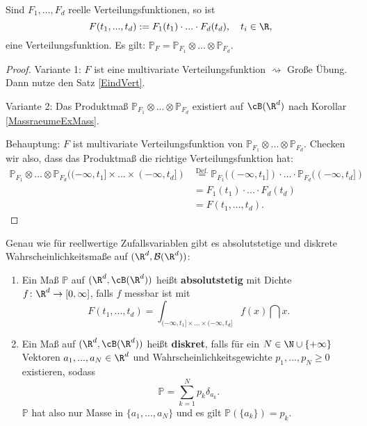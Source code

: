 \begin{prop}\label{id}
	Sind $F_1,...,F_d$ reelle Verteilungsfunktionen, so ist $$ F(t_1,...,t_d) := F_1(t_1)\cdot ... \cdot F_d(t_d),\quad t_i \in \R,$$ eine Verteilungsfunktion. Es gilt: $\mathbb{P}_F = \mathbb{P}_{F_1} \otimes ... \otimes \mathbb{P}_{F_d}$.
\end{prop}

\begin{proof}
Variante 1: $F$ ist eine multivariate Verteilungsfunktion $\rightsquigarrow$ Große Übung. Dann nutze den Satz \ref{EindVert}.\smallskip

Variante 2: Das Produktmaß $\mathbb{P}_{F_1} \otimes ... \otimes \mathbb{P}_{F_d}$ existiert auf $ \cB(\R^d)$ nach Korollar \ref{MassraeumeExMass}.
		
		Behauptung: $F$ ist multivariate Verteilungsfunktion von $\mathbb{P}_{F_1} \otimes ... \otimes \mathbb{P}_{F_d}$. Checken wir also, dass das Produktma\ss{} die richtige Verteilungsfunktion hat:
		\begin{align*}
			\mathbb{P}_{F_1} \otimes ... \otimes \mathbb{P}_{F_d}((-\infty,t_1] \times ... \times (-\infty,t_d]) &\overset{\text{Def.}}{=} \mathbb{P}_{F_1}((-\infty,t_1]) \cdot ... \cdot \mathbb{P}_{F_d}((-\infty,t_d]) \\
			&= F_1(t_1) \cdot ... \cdot F_d(t_d) \\
			&= F(t_1,...,t_d).
		\end{align*}
\end{proof}
Genau wie f\"ur reellwertige Zufallsvariablen gibt es absolutstetige und diskrete Wahrscheinlichkeitsma\ss e auf $(\R^d, \mathcal B(\R^d))$:
\begin{deff}
	\begin{enumerate}[label=(\roman*)]
		\item Ein Maß $\mathbb{P}$ auf $(\R^d,\cB(\R^d))$ heißt \textbf{absolutstetig} mit Dichte $f\colon \R^d \to [0, \infty]$, falls $f$ messbar ist mit \[ F(t_1,...,t_d) = \int_{(-\infty,t_1]\times ...\times (-\infty,t_d]}f(x)\dint x. \]
		\item Ein Maß auf $(\R^d,\cB(\R^d))$ heißt \textbf{diskret}, falls f\"ur ein $N\in \N\cup \{+\infty\}$ Vektoren $a_1,...,a_N \in \R^d$ und Wahrscheinlichkeitsgewichte $p_1,...,p_N \geq 0$ existieren, sodass \[ \mathbb{P} = \sum\limits_{k=1}^{N} p_k \delta_{a_k}. \] $\mathbb{P}$ hat also nur Masse in $\{ a_1,...,a_N\}$ und es gilt $\mathbb{P}(\{ a_k \}) = p_k$.
	\end{enumerate}
\end{deff}
